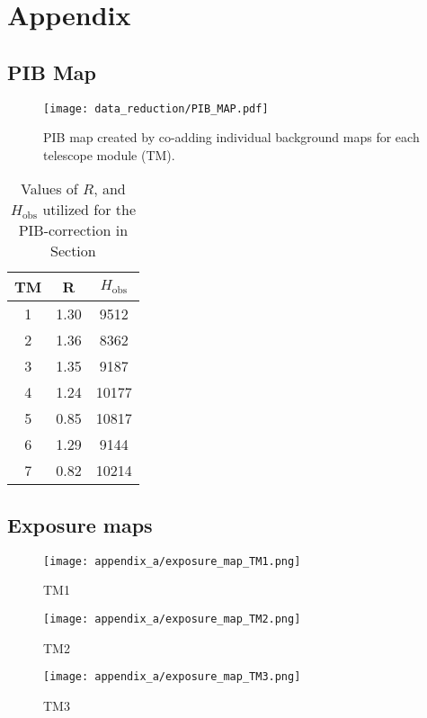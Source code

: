 \chapter{Appendix}
\section{PIB Map}\label{sec:appendix_a_pib_map}
\begin{figure}[htbp]
    \centering
    \texttt{[image: data\_reduction/PIB\_MAP.pdf]}
    \caption{PIB map created by co-adding individual background maps for each telescope module (TM).}
    \label{fig:pib_map}
\end{figure}
\begin{table}[htbp]
    \centering
    \begin{tabular}{ccc}
        \toprule
        TM & R & $H_\text{obs}$ \\ 
        \midrule
        1 & 1.30 & 9512 \\
        2 & 1.36 & 8362 \\
        3 & 1.35 & 9187 \\
        4 & 1.24 & 10177 \\
        5 & 0.85 & 10817 \\
        6 & 1.29 & 9144 \\
        7 & 0.82 & 10214 \\
        \bottomrule
    \end{tabular}
    \caption{Values of \(R\), and $H_\text{obs}$ utilized for the PIB-correction in Section}
    \label{tab:values}
\end{table}
\section{Exposure maps}\label{sec:appendix_a_exposure_map}
%
\begin{figure}[htbp]
    \centering
    \texttt{[image: appendix\_a/exposure\_map\_TM1.png]}
    \caption{TM1}
    \label{fig:TM1}
\end{figure}

\begin{figure}[htbp]
    \centering
    \texttt{[image: appendix\_a/exposure\_map\_TM2.png]}
    \caption{TM2}
    \label{fig:TM2}
\end{figure}

\begin{figure}[htbp]
    \centering
    \texttt{[image: appendix\_a/exposure\_map\_TM3.png]}
    \caption{TM3}
    \label{fig:TM3}
\end{figure}


